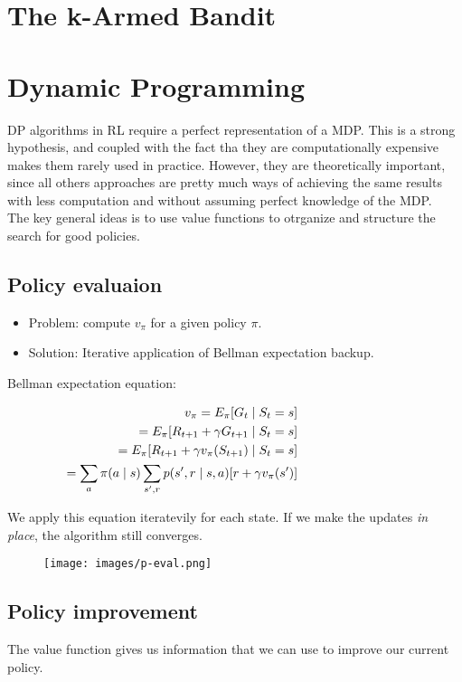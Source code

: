 \documentclass[12pt]{article}
\begin{document}
\maketitle

\section{The k-Armed Bandit}


\section{Dynamic Programming}

DP algorithms in RL require a perfect representation of a MDP. This is a strong hypothesis,
and coupled with the fact tha they are computationally expensive makes them rarely used in practice.
However, they are theoretically important, since all others approaches are pretty much ways of achieving 
the same results with less computation and without assuming perfect knowledge of the MDP.\\
The key general ideas is to use value functions to otrganize and structure the search for good policies.

\subsection{Policy evaluaion}

\begin{itemize}
   \item  Problem: compute $v_{\pi}$ for a given policy $\pi$.
   \item Solution: Iterative application of Bellman expectation backup.
 \end{itemize}
 
Bellman expectation equation:

\begin{align}
v_{\pi} = E_{\pi}[G_t \mid S_t = s] \mspace{150mu}\notag\\
= E_{\pi}[R_{t+1} + \gamma G_{t+1} \mid S_t = s] \mspace{150mu}\notag\\
= E_{\pi}[R_{t+1} + \gamma v_{\pi}(S_{t+1}) \mid S_t = s] \mspace{150mu}\notag\\
= \sum_a \pi(a \mid s) \sum_{s',r} p(s', r \mid s, a)[r + \gamma v_{\pi}(s')]\mspace{150mu}
\end{align}

We apply this equation iteratevily for each state. If we make the updates \textit{in place},
the algorithm still converges.

\begin{figure}[H]
  \texttt{[image: images/p-eval.png]}
\end{figure}

\subsection{Policy improvement}
The value function gives us information that we can use to improve our current policy.
\end{document}
